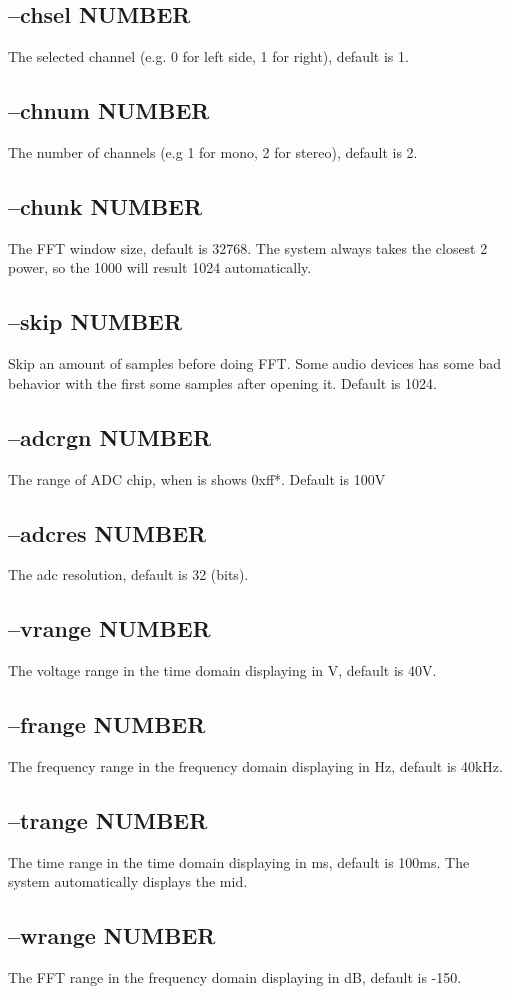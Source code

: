 \documentclass[10pt,a4paper]{article}
\begin{document}
\subsection{--chsel NUMBER}
The selected channel (e.g. 0 for left side, 1 for right), default is 1.
\subsection{--chnum NUMBER}
The number of channels (e.g 1 for mono, 2 for stereo), default is 2.
\subsection{--chunk NUMBER}
The FFT window size, default is 32768. The system always takes the closest 2 power, so the 1000 will result 1024 automatically.
\subsection{--skip NUMBER}
Skip an amount of samples before doing FFT. Some audio devices has some bad behavior with the first some samples after opening it. Default is 1024.
\subsection{--adcrgn NUMBER}
The range of ADC chip, when is shows 0xff*. Default is 100V
\subsection{--adcres NUMBER}
The adc resolution, default is 32 (bits).
\subsection{--vrange NUMBER}
The voltage range in the time domain displaying in V, default is 40V.
\subsection{--frange NUMBER}
The frequency range in the frequency domain displaying in Hz, default is 40kHz. 
\subsection{--trange NUMBER}
The time range in the time domain displaying in ms, default is 100ms. The system automatically displays the mid.
\subsection{--wrange NUMBER}
The FFT range in the frequency domain displaying in dB, default is -150.
\end{document}
